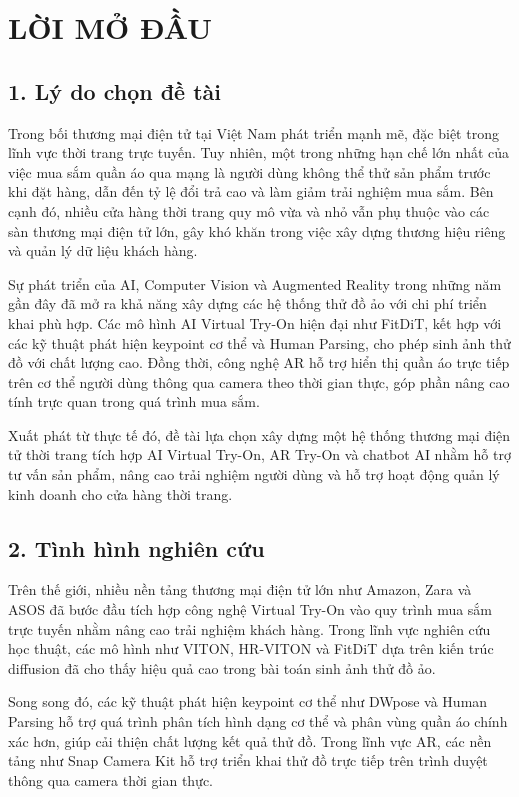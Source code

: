 \chapter*{LỜI MỞ ĐẦU}

\section*{1. Lý do chọn đề tài}

Trong bối thương mại điện tử tại Việt Nam phát triển mạnh mẽ, đặc biệt trong lĩnh vực thời trang trực tuyến. Tuy nhiên, một trong những hạn chế lớn nhất của việc mua sắm quần áo qua mạng là người dùng không thể thử sản phẩm trước khi đặt hàng, dẫn đến tỷ lệ đổi trả cao và làm giảm trải nghiệm mua sắm. Bên cạnh đó, nhiều cửa hàng thời trang quy mô vừa và nhỏ vẫn phụ thuộc vào các sàn thương mại điện tử lớn, gây khó khăn trong việc xây dựng thương hiệu riêng và quản lý dữ liệu khách hàng.

Sự phát triển của AI, Computer Vision và Augmented Reality trong những năm gần đây đã mở ra khả năng xây dựng các hệ thống thử đồ ảo với chi phí triển khai phù hợp. Các mô hình AI Virtual Try-On hiện đại như FitDiT, kết hợp với các kỹ thuật phát hiện keypoint cơ thể và Human Parsing, cho phép sinh ảnh thử đồ với chất lượng cao. Đồng thời, công nghệ AR hỗ trợ hiển thị quần áo trực tiếp trên cơ thể người dùng thông qua camera theo thời gian thực, góp phần nâng cao tính trực quan trong quá trình mua sắm.

Xuất phát từ thực tế đó, đề tài lựa chọn xây dựng một hệ thống thương mại điện tử thời trang tích hợp AI Virtual Try-On, AR Try-On và chatbot AI nhằm hỗ trợ tư vấn sản phẩm, nâng cao trải nghiệm người dùng và hỗ trợ hoạt động quản lý kinh doanh cho cửa hàng thời trang.

\section*{2. Tình hình nghiên cứu}

Trên thế giới, nhiều nền tảng thương mại điện tử lớn như Amazon, Zara và ASOS đã bước đầu tích hợp công nghệ Virtual Try-On vào quy trình mua sắm trực tuyến nhằm nâng cao trải nghiệm khách hàng. Trong lĩnh vực nghiên cứu học thuật, các mô hình như VITON, HR-VITON và FitDiT dựa trên kiến trúc diffusion đã cho thấy hiệu quả cao trong bài toán sinh ảnh thử đồ ảo.

Song song đó, các kỹ thuật phát hiện keypoint cơ thể như DWpose và Human Parsing hỗ trợ quá trình phân tích hình dạng cơ thể và phân vùng quần áo chính xác hơn, giúp cải thiện chất lượng kết quả thử đồ. Trong lĩnh vực AR, các nền tảng như Snap Camera Kit hỗ trợ triển khai thử đồ trực tiếp trên trình duyệt thông qua camera thời gian thực.

